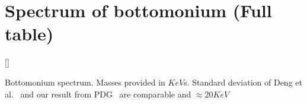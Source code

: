 \section{Spectrum of bottomonium (Full table)} \label{sec:app:bot-spectrum}
\begin{table} \begin{floatrow}
[\Xhsize]
    {\caption{Bottomonium spectrum. Masses provided in $KeV$s. Standard deviation of Deng et al.~\cite{deng-bot} and our result from PDG~\cite{pdg} are comparable and $\approx 20KeV$}}
    {}
\end{floatrow} \end{table}
